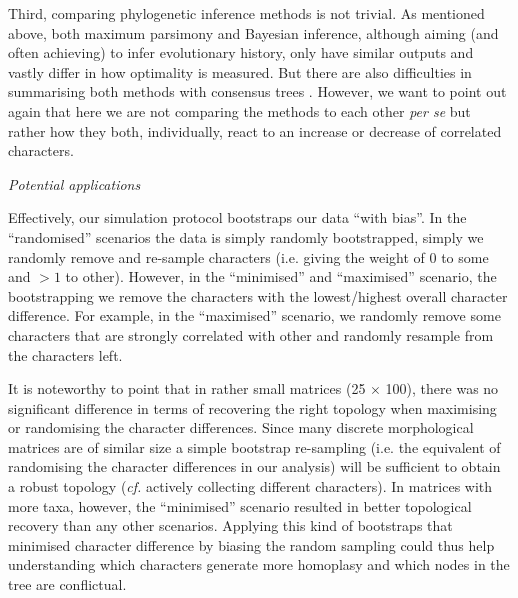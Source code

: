 \documentclass[12pt,letterpaper]{article}
\renewcommand{\subsection}[1]{%
\bigskip
\begin{center}
\begin{large}
\normalfont\itshape #1
\end{large}
\end{center}}
\begin{document}
Third, comparing phylogenetic inference methods is not trivial.
As mentioned above, both maximum parsimony and Bayesian inference, although aiming (and often achieving) to infer evolutionary history, only have similar outputs and vastly differ in how optimality is measured.
But there are also difficulties in summarising both methods with consensus trees \cite{oReilly2017efficacy}.
However, we want to point out again that here we are not comparing the methods to each other \textit{per se} but rather how they both, individually, react to an increase or decrease of correlated characters.

\subsection{Potential applications}
Effectively, our simulation protocol bootstraps our data ``with bias''.
In the ``randomised'' scenarios the data is simply randomly bootstrapped, simply we randomly remove and re-sample characters (i.e. giving the weight of $0$ to some and $>1$ to other).
However, in the ``minimised'' and ``maximised'' scenario, the bootstrapping we remove the characters with the lowest/highest overall character difference.
For example, in the ``maximised'' scenario, we randomly remove some characters that are strongly correlated with other and randomly resample from the characters left.

It is noteworthy to point that in rather small matrices (25 $\times$ 100), there was no significant difference in terms of recovering the right topology when maximising or randomising the character differences.
Since many discrete morphological matrices are of similar size \citep{guillerme2016assessment} a simple bootstrap re-sampling (i.e. the equivalent of randomising the character differences in our analysis) will be sufficient to obtain a robust topology (\textit{cf.} actively collecting different characters).
In matrices with more taxa, however, the ``minimised'' scenario resulted in better topological recovery than any other scenarios.
Applying this kind of bootstraps that minimised character difference by biasing the random sampling could thus help understanding which characters generate more homoplasy and which nodes in the tree are conflictual.
\end{document}
